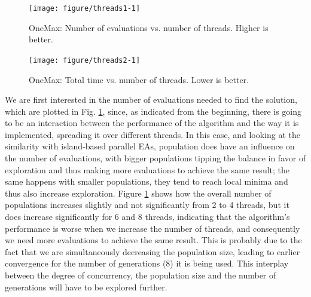 \documentclass[sigconf]{acmart}\usepackage[]{graphicx}\usepackage[]{color}
\newenvironment{knitrout}{}{} %
\begin{document}
\begin{figure}[h!tb]
  \centering
\begin{knitrout}
\color{fgcolor}
\texttt{[image: figure/threads1-1]} 

\end{knitrout}
\caption{OneMax: Number of evaluations vs. number of threads. Higher is better.}
\label{fig:threads1}
\end{figure}
%
\begin{figure}[h!tb]
  \centering
\begin{knitrout}
\color{fgcolor}
\texttt{[image: figure/threads2-1]} 

\end{knitrout}
\caption{OneMax: Total time vs. number of threads. Lower is better.}
\label{fig:threads2}
\end{figure}
%
We are first interested in the number of evaluations needed to find
the solution, which are plotted in Fig. \ref{fig:threads1}, since, as
indicated from the beginning, there is going to be an interaction
between the performance of the algorithm and the way it is
implemented, spreading it over different threads. In this case, and
looking at the similarity with island-based parallel EAs, population
does have an influence on the number of evaluations, with bigger
populations tipping the balance in favor of exploration and thus
making more evaluations to achieve the same result; the same happens
with smaller populations, they tend to reach local minima and thus
also increase exploration. Figure \ref{fig:threads1} shows how the
overall number of populations
increases slightly and not significantly from 2 to 4 threads, but it
does increase significantly for 6 and 8 threads, indicating that the
algorithm's performance is worse when we increase the number
of threads, and consequently we need more evaluations to achieve the
same result. This is probably due to the fact that we are
simultaneously decreasing the population size, leading to earlier
convergence for the number of generations (8) it is being used. This
interplay between the degree of concurrency, the population size and
the number of generations will have to be explored further.
\end{document}
